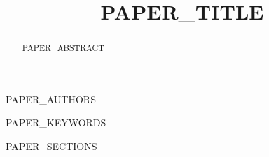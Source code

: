\documentclass[conference]{IEEEtran}
\begin{document}
\title{{{PAPER_TITLE}}}

{{PAPER_AUTHORS}}

\maketitle

\begin{abstract}
{{PAPER_ABSTRACT}}
\end{abstract}

\begin{IEEEkeywords}
{{PAPER_KEYWORDS}}
\end{IEEEkeywords}

{{PAPER_SECTIONS}}



\end{document}
